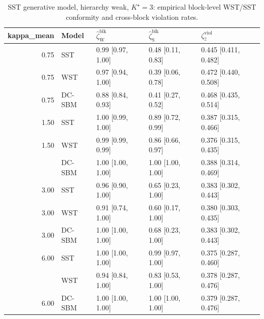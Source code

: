 \begin{table}
\centering
\caption{SST generative model, hierarchy weak, $K^\star=3$: empirical block-level WST/SST conformity and cross-block violation rates.}
\centering
\begin{tabular}[t]{rllll}
\toprule
kappa_mean & Model & $\widehat\zeta_{\mathrm{W}}^{\mathrm{blk}}$ & $\widehat\zeta_{\mathrm{S}}^{\mathrm{blk}}$ & $\zeta^{\mathrm{viol}}_{\hat z}$\\
\midrule
0.75 & SST & 0.99 [0.97, 1.00] & 0.48 [0.11, 0.83] & 0.445 [0.411, 0.482]\\
0.75 & WST & 0.97 [0.94, 1.00] & 0.39 [0.06, 0.78] & 0.472 [0.440, 0.508]\\
0.75 & DC-SBM & 0.88 [0.84, 0.93] & 0.41 [0.27, 0.52] & 0.468 [0.435, 0.514]\\
1.50 & SST & 1.00 [0.99, 1.00] & 0.89 [0.72, 0.99] & 0.387 [0.315, 0.466]\\
1.50 & WST & 0.99 [0.99, 0.99] & 0.86 [0.66, 0.97] & 0.376 [0.315, 0.435]\\
\addlinespace
1.50 & DC-SBM & 1.00 [1.00, 1.00] & 1.00 [1.00, 1.00] & 0.388 [0.314, 0.469]\\
3.00 & SST & 0.96 [0.90, 1.00] & 0.65 [0.23, 1.00] & 0.383 [0.302, 0.443]\\
3.00 & WST & 0.91 [0.74, 1.00] & 0.60 [0.17, 1.00] & 0.380 [0.303, 0.435]\\
3.00 & DC-SBM & 1.00 [1.00, 1.00] & 0.68 [0.23, 1.00] & 0.383 [0.302, 0.443]\\
6.00 & SST & 1.00 [1.00, 1.00] & 0.99 [0.97, 1.00] & 0.375 [0.287, 0.460]\\
\addlinespace
6.00 & WST & 0.94 [0.84, 1.00] & 0.83 [0.53, 1.00] & 0.378 [0.287, 0.476]\\
6.00 & DC-SBM & 1.00 [1.00, 1.00] & 1.00 [1.00, 1.00] & 0.379 [0.287, 0.476]\\
\bottomrule
\end{tabular}
\end{table}
